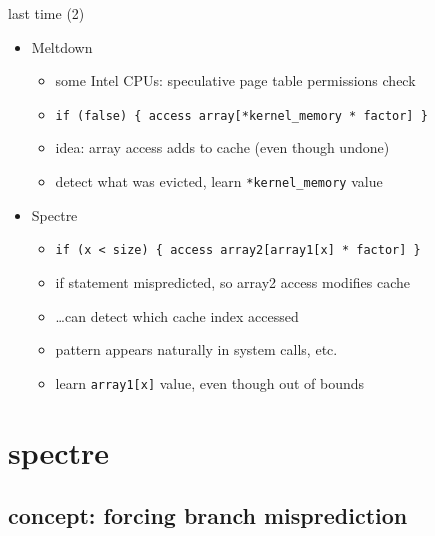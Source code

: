 \begin{frame}[fragile]{last time (2)}
    \begin{itemize}
    \item Meltdown 
        \begin{itemize}
        \item some Intel CPUs: speculative page table permissions check
        \item \verb|if (false) { access array[*kernel_memory * factor] }|
        \item idea: array access adds to cache (even though undone)
        \item detect what was evicted, learn \verb|*kernel_memory| value
        \end{itemize}
    \item Spectre
        \begin{itemize}
        \item \verb|if (x < size) { access array2[array1[x] * factor] }|
        \item if statement mispredicted, so array2 access modifies cache
        \item \ldots can detect which cache index accessed
        \item pattern appears naturally in system calls, etc.
        \item learn \verb|array1[x]| value, even though out of bounds
        \end{itemize}
    \end{itemize}
\end{frame}




\section{spectre}











\subsection{concept: forcing branch misprediction}


